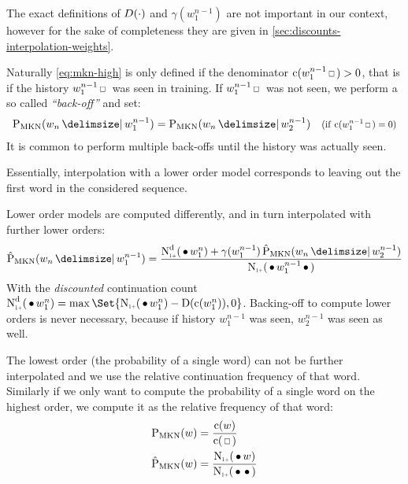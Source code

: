 The exact definitions of $D(\cdot)$ and $\gamma(w_1^{n-1})$ are not
important in our context, however for the sake of completeness they are given
in \cref{sec:discounts-interpolation-weights}.

Naturally \cref{eq:mkn-high} is only defined if the denominator
${\Count(w_1^{n-1} \Skp) > 0}$, that is if the history $w_1^{n-1} \Skp$ was seen
in training.
If $w_1^{n-1} \Skp$ was not seen, we perform a so called \emph{``back-off''}
and set:
\begin{align}
  \label{eq:mkn-backoff}
  \ProbMKN{w_n}{w_1^{n-1}} = \ProbMKN{w_n}{w_2^{n-1}}
      & & \Condition{\Count(w_1^{n-1} \Skp) = 0}
\end{align}
It is common to perform multiple back-offs until the history was actually seen.

\begin{draft}
Essentially, interpolation with a lower order model corresponds to leaving out
the first word in the considered sequence.
\end{draft}
Lower order models are computed differently, and in turn interpolated with
further lower orders:
\begin{equation}
  \label{eq:mkn-low}
  \ProbMKN*{w_n}{w_1^{n-1}} =
    \frac{\DiscountedCount*(\WSkp w_1^n) + \gamma(w_1^{n-1}) \ProbMKN*{w_n}{w_2^{n-1}}}
         {\ContCountIp(\WSkp w_1^{n-1} \WSkp)} \\
\end{equation}
With the \emph{discounted} continuation count
${\DiscountedCount*(\WSkp w_1^n) = \max\Set{ \ContCountIp(\WSkp w_1^n) - \Discount(\Count(w_1^n)), 0 }}$.
Backing-off to compute lower orders is never necessary, because
if history $w_1^{n-1}$ was seen, $w_2^{n-1}$ was seen as well.

The lowest order (the probability of a single word) can not be further
interpolated and we use the relative continuation frequency of that word.
Similarly if we only want to compute the probability of a single word on the
highest order, we compute it as the relative frequency of that word:
\begin{subequations}
  \label{eq:mkn-lowest}
  \begin{align}
    \ProbMKN {w} &= \frac{\Count(w)}{\Count(\Skp)} \\
    \ProbMKN*{w} &= \frac{\ContCountIp(\WSkp w)}{\ContCountIp(\WSkp \WSkp)}
  \end{align}
\end{subequations}

